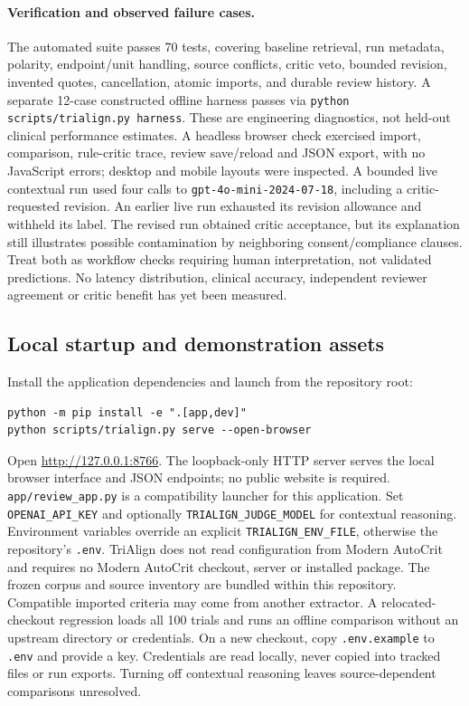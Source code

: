 \documentclass[10pt,letterpaper]{article}
\newcommand{\pathcode}[1]{\nolinkurl{#1}}
\begin{document}
\paragraph{Verification and observed failure cases.}
The automated suite passes 70 tests, covering baseline retrieval, run metadata,
polarity, endpoint/unit handling, source conflicts,
critic veto, bounded revision, invented quotes, cancellation, atomic imports,
and durable review history. A separate 12-case constructed offline harness
passes via \pathcode{python scripts/trialign.py harness}. These are engineering
diagnostics, not held-out clinical performance estimates.
A headless browser check exercised import, comparison, rule-critic trace,
review save/reload and JSON export, with no JavaScript errors; desktop and
mobile layouts were inspected. A bounded live contextual run used four calls
to \pathcode{gpt-4o-mini-2024-07-18}, including a critic-requested revision.
An earlier live run exhausted its revision allowance and withheld its label.
The revised run obtained critic acceptance, but its explanation still illustrates
possible contamination by neighboring consent/compliance clauses. Treat both
as workflow checks requiring human interpretation, not validated predictions.
No latency distribution, clinical accuracy, independent reviewer agreement or
critic benefit has yet been measured.

\subsection{Local startup and demonstration assets}
\label{sec:localdemo}
Install the application dependencies and launch from the repository root:
\begin{verbatim}
python -m pip install -e ".[app,dev]"
python scripts/trialign.py serve --open-browser
\end{verbatim}
Open \url{http://127.0.0.1:8766}. The loopback-only HTTP server serves the
local browser interface and JSON endpoints; no public website is required.
\pathcode{app/review_app.py} is a compatibility launcher for this application.
Set \pathcode{OPENAI_API_KEY} and optionally \pathcode{TRIALIGN_JUDGE_MODEL}
for contextual reasoning. Environment variables override an explicit
\pathcode{TRIALIGN_ENV_FILE}, otherwise the repository's \pathcode{.env}.
TriAlign does not read configuration from Modern AutoCrit and requires no
Modern AutoCrit checkout, server or installed package. The frozen corpus and
source inventory are bundled within this repository. Compatible imported
criteria may come from another extractor. A relocated-checkout regression
loads all 100 trials and runs an offline comparison without an upstream
directory or credentials. On a new checkout,
copy \pathcode{.env.example} to \pathcode{.env} and provide a key.
Credentials are read locally, never copied into tracked files or run exports.
Turning off contextual reasoning leaves source-dependent comparisons unresolved.
\end{document}
